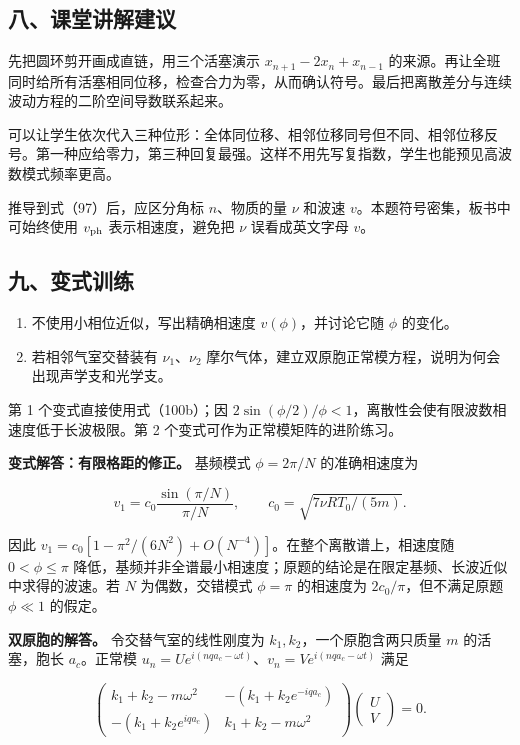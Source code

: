 \documentclass[12pt,a4paper,UTF8]{ctexart}
\newcommand{\tightlist}{\setlength{\itemsep}{0pt}\setlength{\parskip}{0pt}}
\begin{document}
\subsection{八、课堂讲解建议}\label{ux516bux8bfeux5802ux8bb2ux89e3ux5efaux8bae-6}

先把圆环剪开画成直链，用三个活塞演示 \(x_{n+1}-2x_n+x_{n-1}\)
的来源。再让全班同时给所有活塞相同位移，检查合力为零，从而确认符号。最后把离散差分与连续波动方程的二阶空间导数联系起来。

可以让学生依次代入三种位形：全体同位移、相邻位移同号但不同、相邻位移反号。第一种应给零力，第三种回复最强。这样不用先写复指数，学生也能预见高波数模式频率更高。

推导到式（97）后，应区分角标 \(n\)、物质的量 \(\nu\) 和波速
\(v\)。本题符号密集，板书中可始终使用 \(v_{\rm ph}\) 表示相速度，避免把
\(\nu\) 误看成英文字母 \(v\)。

\subsection{九、变式训练}\label{ux4e5dux53d8ux5f0fux8badux7ec3-6}

\begin{enumerate}
\def\labelenumi{\arabic{enumi}.}
\tightlist
\item
  不使用小相位近似，写出精确相速度 \(v(\phi)\)，并讨论它随 \(\phi\)
  的变化。
\item
  若相邻气室交替装有 \(\nu_1\)、\(\nu_2\)
  摩尔气体，建立双原胞正常模方程，说明为何会出现声学支和光学支。
\end{enumerate}

第 1 个变式直接使用式（100b）；因
\(2\sin(\phi/2)/\phi<1\)，离散性会使有限波数相速度低于长波极限。第 2
个变式可作为正常模矩阵的进阶练习。

\textbf{变式解答：有限格距的修正。} 基频模式 \(\phi=2\pi/N\)
的准确相速度为

\[v_1=c_0\frac{\sin(\pi/N)}{\pi/N},\qquad c_0=\sqrt{7\nu RT_0/(5m)}.\]

因此 \(v_1=c_0[1-\pi^2/(6N^2)+O(N^{-4})]\)。在整个离散谱上，相速度随
\(0<\phi\le\pi\)
降低，基频并非全谱最小相速度；原题的结论是在限定基频、长波近似中求得的波速。若
\(N\) 为偶数，交错模式 \(\phi=\pi\) 的相速度为
\(2c_0/\pi\)，但不满足原题 \(\phi\ll1\) 的假定。

\textbf{双原胞的解答。} 令交替气室的线性刚度为
\(k_1,k_2\)，一个原胞含两只质量 \(m\) 的活塞，胞长 \(a_c\)。正常模
\(u_n=Ue^{i(nqa_c-\omega t)}\)、\(v_n=Ve^{i(nqa_c-\omega t)}\) 满足

\[\begin{pmatrix}k_1+k_2-m\omega^2&-(k_1+k_2e^{-iqa_c})\\-(k_1+k_2e^{iqa_c})&k_1+k_2-m\omega^2\end{pmatrix}\begin{pmatrix}U\\V\end{pmatrix}=0.\]
\end{document}
